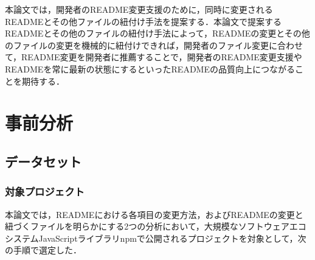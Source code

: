 \documentclass[submit]{ipsj}
\begin{document}
本論文では，開発者のREADME変更支援のために，同時に変更されるREADMEとその他ファイルの紐付け手法を提案する．本論文で提案するREADMEとその他のファイルの紐付け手法によって，READMEの変更とその他のファイルの変更を機械的に紐付けできれば，開発者のファイル変更に合わせて，README変更を開発者に推薦することで，開発者のREADME変更支援やREADMEを常に最新の状態にするといったREADMEの品質向上につながることを期待する．


%





\section{事前分析}
\subsection{データセット}
\subsubsection{対象プロジェクト}
本論文では，READMEにおける各項目の変更方法，およびREADMEの変更と紐づくファイルを明らかにする2つの分析において，大規模なソフトウェアエコシステムJavaScriptライブラリnpmで公開されるプロジェクトを対象として，次の手順で選定した．
\end{document}
